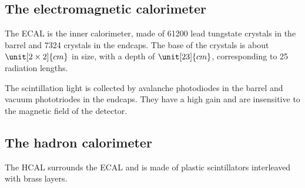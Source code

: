 \subsection{The electromagnetic calorimeter}
The ECAL is the inner calorimeter, made of 61200 lead tungstate crystals in
the barrel and 7324 crystals in the endcaps.
The base of the crystals is about $\unit[2\times2]{cm}$ in size, with a
depth of $\unit[23]{cm}$, corresponding to 25 radiation lengths.

The scintillation light is collected by avalanche photodiodes in the barrel
and vacuum phototriodes in the endcaps. They have a high gain and are
insensitive to the magnetic field of the detector.

\subsection{The hadron calorimeter}
The HCAL surrounds the ECAL and is made of plastic scintillators interleaved with brass layers.

